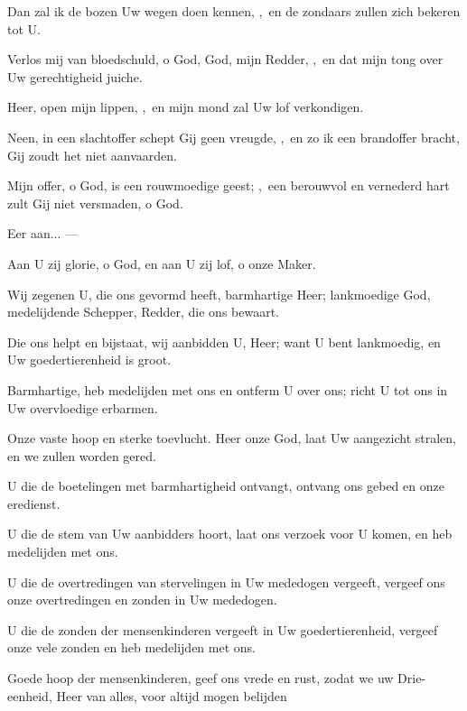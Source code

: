 \documentclass[12pt,twoside,a5paper]{article}
\begin{document}
\begin{halfparskip}
  Dan zal ik de bozen Uw wegen doen kennen, \sep\ en de zondaars zullen zich bekeren tot U.

  Verlos mij van bloedschuld, o God, God, mijn Redder, \sep\ en dat mijn tong over Uw gerechtigheid juiche.

  Heer, open mijn lippen, \sep\ en mijn mond zal Uw lof verkondigen.

  Neen, in een slachtoffer schept Gij geen vreugde, \sep\ en zo ik een brandoffer bracht, Gij zoudt het niet aanvaarden.

  Mijn offer, o God, is een rouwmoedige geest; \sep\ een berouwvol en vernederd hart zult Gij niet versmaden, o God.

  Eer aan... --- 
\end{halfparskip}



\begin{halfparskip}
   Aan U zij glorie, o God, en aan U zij lof, o onze Maker.

  Wij zegenen U, die ons gevormd heeft, barmhartige Heer; lankmoedige God, medelijdende Schepper, Redder, die ons bewaart.

  Die ons helpt en bijstaat, wij aanbidden U, Heer; want U bent lankmoedig, en Uw goedertierenheid is groot.

  Barmhartige, heb medelijden met ons en ontferm U over ons; richt U tot ons in Uw overvloedige erbarmen.

  Onze vaste hoop en sterke toevlucht. Heer onze God, laat Uw aangezicht stralen, en we zullen worden gered.

  U die de boetelingen met barmhartigheid ontvangt, ontvang ons gebed en onze eredienst.

  U die de stem van Uw aanbidders hoort, laat ons verzoek voor U komen, en heb medelijden met ons.

  U die de overtredingen van stervelingen in Uw mededogen vergeeft, vergeef ons onze overtredingen en zonden in Uw mededogen.

  U die de zonden der mensenkinderen vergeeft in Uw goedertierenheid, vergeef onze vele zonden en heb medelijden met ons.

  Goede hoop der mensenkinderen, geef ons vrede en rust, zodat we uw Drie-eenheid, Heer van alles, voor altijd mogen belijden 
\end{halfparskip}
\end{document}
